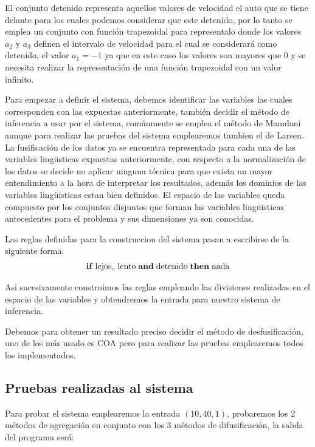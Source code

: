 \documentclass[a4paper,10pt,twocolumn]{article}
\begin{document}
El conjunto detenido representa aquellos valores de velocidad el auto que se tiene delante para los cuales podemos considerar que este detenido, por lo tanto se emplea un conjunto con funci\'on trapezoidal para representalo donde los valores $a_2$ y $a_3$ definen el intervalo de velocidad para el cual se considerar\'a como detenido, el valor $a_1 = -1$ ya que en este caso los valores son mayores que 0 y se necesita realizar la representaci\'on de una funci\'on trapezoidal con un valor infinito.

Para empezar a definir el sistema, debemos identificar las variables las cuales corresponden con las expuestas anteriormente, tambi\'en decidir el m\'etodo de inferencia a usar por el sistema, com\'unmente se emplea el m\'etodo de Mamdani aunque para realizar las pruebas del sistema emplearemos tambien el de Larsen.
La fusificaci\'on de los datos ya se encuentra representada para cada una de las variables ling\"usticas expuestas anteriormente, con respecto a la normalizaci\'on de los datos se decide no aplicar ninguna t\'ecnica para que exista un mayor entendimiento a la hora de interpretar los resultados, adem\'as los dominios de las variables ling\"uisticas estan bien definidos. El espacio de las variables queda compuesto por los conjuntos disjuntos que forman las variables ling\"uisticas antecedentes para el problema y sus dimensiones ya son conocidas.

Las reglas definidas para la construccion del sistema pasan a escribirse de la siguiente forma:
	\begin{align*}
		\bf{if} \;\text{lejos}, \;\text{lento}\; \bf{and} \;\text{detenido} \;\bf{then}\;\text{nada}
	\end{align*}

Asi sucesivamente construimos las reglas empleando las divisiones realizadas en el espacio de las variables y obtendremos la entrada para nuestro sistema de inferencia.

Debemos para obtener un resultado preciso decidir el m\'etodo de desfusificaci\'on, uno de los m\'as usado es COA pero para realizar las pruebas emplearemos todos los implementados.

\subsection*{Pruebas realizadas al sistema}

Para probar el sistema emplearemos la entrada $(10, 40, 1)$, probaremos los 2 m\'etodos de agregaci\'on en conjunto con los 3 m\'etodos de difusificaci\'on, la salida del programa ser\'a:
\end{document}
